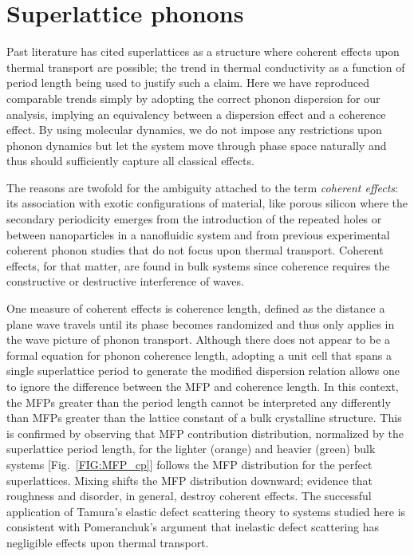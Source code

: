 \documentclass[aps,prb,preprint,preprintnumbers,amsmath,amssymb,floatfix,superscriptaddress]{revtex4}
\begin{document}
\section{Superlattice phonons}

Past literature has cited superlattices as a structure where coherent effects upon thermal transport are possible; the trend in thermal conductivity as a function of period length being used to justify such a claim.\cite{PhysRevB.67.195311,PhysRevB.72.174302,PhysRevB.61.3091} Here we have reproduced comparable trends simply by adopting the correct phonon dispersion for our analysis, implying an equivalency between a dispersion effect and a coherence effect. By using molecular dynamics, we do not impose any restrictions upon phonon dynamics but let the system move through phase space naturally and thus should sufficiently capture all classical effects. 

The reasons are twofold for the ambiguity attached to the term \textit {coherent effects}: its association with exotic configurations of material, like porous silicon \cite{doi:10.1021/nl102918q} where the secondary periodicity emerges from the introduction of the repeated holes or between nanoparticles in a nanofluidic system \cite{Keblinski2002855} and from previous experimental coherent phonon studies \cite{PhysRevLett.73.740,PhysRevB.75.195309} that do not focus upon thermal transport. Coherent effects, for that matter, are found in bulk systems since coherence requires the constructive or destructive interference of waves.

One measure of coherent effects is coherence length, defined as the distance a plane wave travels until its phase becomes randomized and thus only applies in the wave picture of phonon transport. Although there does not appear to be a formal equation for phonon coherence length, adopting a unit cell that spans a single superlattice period to generate the modified dispersion relation allows one to ignore the difference between the MFP and coherence length.\cite{PhysRevB.67.195311} In this context, the MFPs greater than the period length cannot be interpreted any differently than MFPs greater than the lattice constant of a bulk crystalline structure. This is confirmed by observing that MFP contribution distribution, normalized by the superlattice period length, for the lighter (orange) and heavier (green) bulk systems [Fig.~\ref{FIG:MFP_cp}] follows the MFP distribution for the perfect superlattices. Mixing shifts the MFP distribution downward; evidence that roughness and disorder, in general, destroy coherent effects.\cite{PhysRevB.67.195311,dames_682} The successful application of Tamura's elastic defect scattering theory to systems studied here is consistent with Pomeranchuk's argument that inelastic defect scattering has negligible effects upon thermal transport.\cite{pomeranchuk1942thermal} 
\end{document}
